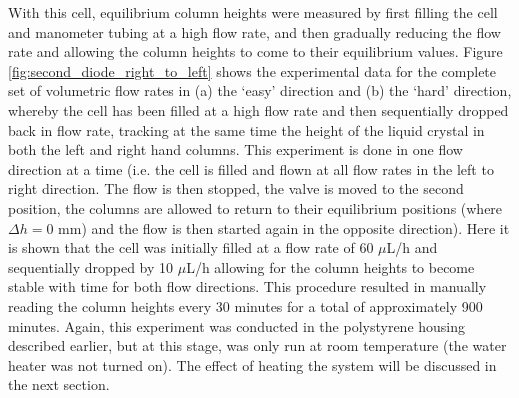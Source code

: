 With this cell, equilibrium column heights were measured by first filling the cell and manometer tubing at a high flow rate, and then gradually reducing the flow rate and allowing the column heights to come to their equilibrium values. Figure \ref{fig:second_diode_right_to_left} shows the experimental data for the complete set of volumetric flow rates in (a) the `easy' direction and (b) the `hard' direction, whereby the cell has been filled at a high flow rate and then sequentially dropped back in flow rate, tracking at the same time the height of the liquid crystal in both the left and right hand columns. This experiment is done in one flow direction at a time (i.e. the cell is filled and flown at all flow rates in the left to right direction. The flow is then stopped, the valve is moved to the second position, the columns are allowed to return to their equilibrium positions (where $\Delta h=0$ mm) and the flow is then started again in the opposite direction). Here it is shown that the cell was initially filled at a flow rate of 60 $\mu$L/h and sequentially dropped by 10 $\mu$L/h allowing for the column heights to become stable with time for both flow directions. This procedure resulted in manually reading the column heights every 30 minutes for a total of approximately 900 minutes. Again, this experiment was conducted in the polystyrene housing described earlier, but at this stage, was only run at room temperature (the water heater was not turned on). The effect of heating the system will be discussed in the next section. 

